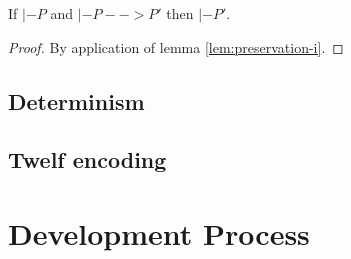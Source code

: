 \documentclass[a4paper, oneside, 10pt, draft]{memoir}
\begin{document}
\begin{thm}
  \label{thm:preservation}
  If $|- P$ and $|- P --> P'$ then $|- P'$.
\end{thm}
\begin{proof}
  By application of lemma \eqref{lem:preservation-i}.
\end{proof}
\section{Determinism}

\section{Twelf encoding}

\chapter{Development Process}
\end{document}
